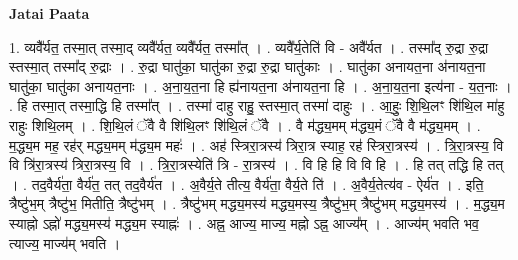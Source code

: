\documentclass[17pt]{extarticle}
\begin{document}
\textbf{Jatai Paata} \newline

1. व्यवै᳚र्यत॒ तस्मा॒त् तस्मा॒द् व्यवै᳚र्यत॒ व्यवै᳚र्यत॒ तस्मा᳚त् । . व्यवै᳚र्य॒तेति॑ वि - अवै᳚र्यत । . तस्मा᳚द् रु॒द्रा रु॒द्रा स्तस्मा॒त् तस्मा᳚द् रु॒द्राः । . रु॒द्रा घातु॑का॒ घातु॑का रु॒द्रा रु॒द्रा घातु॑काः । . घातु॑का अनायत॒ना अ॑नायत॒ना घातु॑का॒ घातु॑का अनायत॒नाः । . अ॒ना॒य॒त॒ना हि ह्य॑नायत॒ना अ॑नायत॒ना हि । . अ॒ना॒य॒त॒ना इत्य॑ना - य॒त॒नाः । . हि तस्मा॒त् तस्मा॒द्धि हि तस्मा᳚त् । . तस्मा॑ दाहु राहु॒ स्तस्मा॒त् तस्मा॑ दाहुः । . आ॒हुः॒ शि॒थि॒लꣳ शि॑थि॒ल मा॑हु राहुः शिथि॒लम् । . शि॒थि॒लं ॅवै वै शि॑थि॒लꣳ शि॑थि॒लं ॅवै । . वै म॑द्ध्य॒मम् म॑द्ध्य॒मं ॅवै वै म॑द्ध्य॒मम् । . म॒द्ध्य॒म मह॒ रह॑र् मद्ध्य॒मम् म॑द्ध्य॒म महः॑ । . अह॑ स्त्रिरा॒त्रस्य॑ त्रिरा॒त्र स्याह॒ रह॑ स्त्रिरा॒त्रस्य॑ । . त्रि॒रा॒त्रस्य॒ वि वि त्रि॑रा॒त्रस्य॑ त्रिरा॒त्रस्य॒ वि । . त्रि॒रा॒त्रस्येति॑ त्रि - रा॒त्रस्य॑ । . वि हि हि वि वि हि । . हि तत् तद्धि हि तत् । . तद॒वैर्य॑ता॒ वैर्य॑त॒ तत् तद॒वैर्य॑त । . अ॒वैर्य॒ते तीत्य॒ वैर्य॑ता॒ वैर्य॒ते ति॑ । . अ॒वैर्य॒तेत्य॑व - ऐर्य॑त । . इति॒ त्रैष्टु॑भ॒म् त्रैष्टु॑भ॒ मितीति॒ त्रैष्टु॑भम् । . त्रैष्टु॑भम् मद्ध्य॒मस्य॑ मद्ध्य॒मस्य॒ त्रैष्टु॑भ॒म् त्रैष्टु॑भम् मद्ध्य॒मस्य॑ । . म॒द्ध्य॒म स्याह्नो ऽह्नो॑ मद्ध्य॒मस्य॑ मद्ध्य॒म स्याह्नः॑ । . अह्न॒ आज्य॒ माज्य॒ मह्नो ऽह्न॒ आज्य᳚म् । . आज्य॑म् भवति भव॒ त्याज्य॒ माज्य॑म् भवति । \newline
\end{document}

